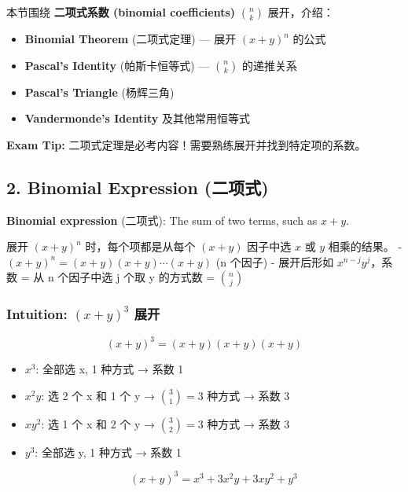 \documentclass[10pt,a4paper,openany]{ctexbook}
\theoremstyle{definition}
\theoremstyle{remark}
\renewenvironment{quote}
  {\list{}{\leftmargin=1em\rightmargin=0pt\topsep=0.5pt\partopsep=0pt}\item[]}
  {\endlist}
\begin{document}
本节围绕 \textbf{二项式系数 (binomial coefficients)} $\binom{n}{k}$ 展开，介绍：
\begin{itemize}
\item \textbf{Binomial Theorem} (二项式定理) — 展开 $(x+y)^n$ 的公式
\item \textbf{Pascal's Identity} (帕斯卡恒等式) — $\binom{n}{k}$ 的递推关系
\item \textbf{Pascal's Triangle} (杨辉三角)
\item \textbf{Vandermonde's Identity} 及其他常用恒等式

\end{itemize}

\textbf{Exam Tip:} 二项式定理是必考内容！需要熟练展开并找到特定项的系数。
\vspace{-2pt}

\subsection{2. Binomial Expression (二项式)}

\begin{quote}
\textbf{Binomial expression} (二项式): The sum of two terms, such as $x + y$.

展开 $(x+y)^n$ 时，每个项都是从每个 $(x+y)$ 因子中选 $x$ 或 $y$ 相乘的结果。
- $(x+y)^n = (x+y)(x+y)\cdots(x+y)$ (n 个因子)
- 展开后形如 $x^{n-j}y^j$，系数 = 从 n 个因子中选 j 个取 y 的方式数 = $\binom{n}{j}$

\end{quote}

\subsubsection{Intuition: $(x+y)^3$ 展开}

\[
(x+y)^3 = (x+y)(x+y)(x+y)
\]

\begin{itemize}
\item $x^3$: 全部选 x, 1 种方式 → 系数 1
\item $x^2y$: 选 2 个 x 和 1 个 y → $\binom{3}{1}=3$ 种方式 → 系数 3
\item $xy^2$: 选 1 个 x 和 2 个 y → $\binom{3}{2}=3$ 种方式 → 系数 3
\item $y^3$: 全部选 y, 1 种方式 → 系数 1

\[
(x+y)^3 = x^3 + 3x^2y + 3xy^2 + y^3
\]


\end{itemize}

\vspace{-2pt}
\end{document}
